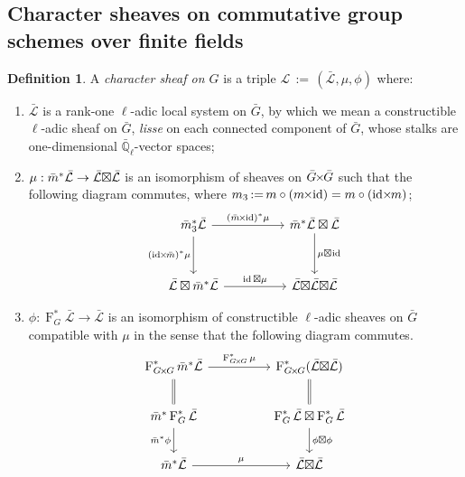 \documentclass[10pt]{amsart}
\makeatletter
\theoremstyle{plain}
\theoremstyle{definition}
\newtheorem{definition}[theorem]{Definition}
\theoremstyle{remark}
\newcommand{\EE}{\mathbb{\bar Q}_\ell}
\newcommand{\Frob}[1]{\operatorname{F}_{#1}}
\DeclareMathOperator{\id}{id}
\newcommand{\ceq}{{\, :=\, }}
\newcommand{\cs}[1]{{\mathcal{#1}}}
\newcommand{\gcs}[1]{{\mathcal{\bar #1}}}
\newcommand{\labitem}[2]{
\def\@itemlabel{\textbf{#1}}
\item
\def\@currentlabel{#1}\label{#2}}
\newcommand{\bm}{\bar{m}}
\newcommand{\bG}{\bar{G}}
\newcommand{\tight}[3]{\hspace{-#1pt}{#2}\hspace{-#3pt}}
\newcommand{\bGxG}{\text{$\bar{G} \tight{1}{\times}{1} \bar{G}$}}
\newcommand{\GxxG}{\text{$G \tight{1}{\times}{1} G$}}
\newcommand{\LxL}{\text{$\gcs{L} \tight{0}{\boxtimes}{0} \gcs{L}$}}
\makeatother
\begin{document}
\subsection{Character sheaves on commutative group schemes over finite fields}\label{ssec:category}

\begin{definition}\label{def:CS}
A \emph{character sheaf on $G$} is a triple
$\cs{L}\ceq (\gcs{L},\mu,\phi)$ where:
\begin{enumerate}
\labitem{(CS.1)}{CS.1} $\gcs{L}$ is a rank-one $\ell$-adic local system on $\bG$, by which we mean a constructible $\ell$-adic sheaf on $\bG$, {\it lisse} on each connected component of $\bG$, whose stalks are one-dimensional $\EE$-vector spaces;
\labitem{(CS.2)}{CS.2} $\mu: \bm^* \gcs{L} \to \LxL$ is an isomorphism of
sheaves on $\bGxG$ such that the following diagram commutes,
  where $m_3 \ceq m\circ (m\tight{1}{\times}{2}\id) = m\circ (\id\tight{2}{\times}{1} m)$;
  \[
  \begin{tikzcd}[row sep=30]
  \bm_3^*\gcs{L} \arrow{rr}{(\bm \tight{1}{\times}{2} \id)^*\mu} \arrow[swap]{d}{(\id \tight{2}{\times}{1} \bm)^*\mu}
    &&  \bm^*\gcs{L} \boxtimes \gcs{L} \dar{\mu \tight{0}{\boxtimes}{1} \id} \\
    \gcs{L} \boxtimes \bm^* \gcs{L} \arrow{rr}{\id \boxtimes \mu}
    &&  \gcs{L} \tight{0}{\boxtimes}{0} \LxL
  \end{tikzcd}
  \]
\labitem{(CS.3)}{CS.3} $\phi : \Frob{G}^* \gcs{L} \to \gcs{L}$ is an
  isomorphism of constructible $\ell$-adic sheaves on $\bG$ compatible with
  $\mu$ in the sense that the following diagram commutes.
  \[
  \begin{tikzcd}[row sep=20]
  \Frob{\GxxG}^* \bm^* \gcs{L} \arrow{rr}{\Frob{\GxxG}^*\mu}
    && \Frob{\GxxG}^*(\LxL)\\
    \arrow[equal]{u} \bm^*  \Frob{G}^* \gcs{L} \arrow[swap]{d}{\bm^* \phi}
    && \Frob{G}^*\gcs{L}\boxtimes \Frob{G}^*\gcs{L} \dar{\phi\boxtimes \phi} \arrow[equal]{u} \\
    \bm^*\gcs{L} \arrow{rr}{\mu}
    && \LxL
  \end{tikzcd}
  \]
\end{enumerate}
\end{definition}
\end{document}
